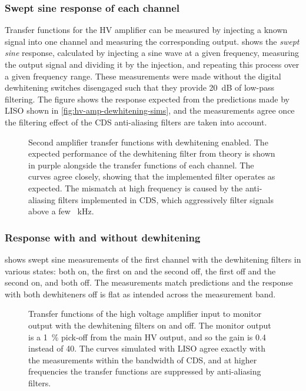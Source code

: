 \subsubsection{Swept sine response of each channel}
Transfer functions for the \gls{HV} amplifier can be measured by injecting a known signal into one channel and measuring the corresponding output.  shows the \emph{swept sine} response, calculated by injecting a sine wave at a given frequency, measuring the output signal and dividing it by the injection, and repeating this process over a given frequency range. These measurements were made without the digital dewhitening switches disengaged such that they provide \SI{20}{\deci\bel} of low-pass filtering. The figure shows the response expected from the predictions made by \gls{LISO} shown in \cref{fig:hv-amp-dewhitening-sims}, and the measurements agree once the filtering effect of the \gls{CDS} anti-aliasing filters are taken into account.

\begin{figure}[htp]
  \centering
  
  \caption[Frequency response of the high voltage amplifier's channels with dewhitening enabled]{Second amplifier transfer functions with dewhitening enabled. The expected performance of the dewhitening filter from theory is shown in purple alongside the transfer functions of each channel. The curves agree closely, showing that the implemented filter operates as expected. The mismatch at high frequency is caused by the anti-aliasing filters implemented in \gls{CDS}, which aggressively filter signals above a few \SI{}{\kilo\hertz}.}
  \label{fig:hv-amp-dewhitened-tfs}
\end{figure}

\subsubsection{Response with and without dewhitening}
 shows swept sine measurements of the first channel with the dewhitening filters in various states: both on, the first on and the second off, the first off and the second on, and both off. The measurements match predictions and the response with both dewhiteners off is flat as intended across the measurement band.

\begin{figure}[htp]
  \centering
  
  \caption[Transfer functions of the high voltage amplifier input to monitor output with the dewhiteners on and off]{Transfer functions of the high voltage amplifier input to monitor output with the dewhitening filters on and off. The monitor output is a \SI{1}{\percent} pick-off from the main \gls{HV} output, and so the gain is \num{0.4} instead of \num{40}. The curves simulated with \gls{LISO} agree exactly with the measurements within the bandwidth of \gls{CDS}, and at higher frequencies the transfer functions are suppressed by anti-aliasing filters.}
  \label{fig:hv-amp-channel-one-tfs}
\end{figure}

